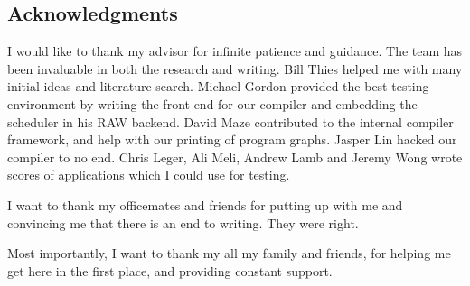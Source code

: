 \newpage

\subsection*{Acknowledgments}

I would like to thank my advisor for infinite patience and guidance. The {\StreamIt} team has been invaluable
in both the research and writing. Bill Thies helped me with many initial ideas and literature search. Michael Gordon
provided the best testing environment by writing the front end for our compiler and embedding the scheduler in his 
RAW backend. David Maze contributed to the internal compiler framework, and help with our printing of program graphs.
Jasper Lin hacked our compiler to no end. Chris Leger, Ali Meli, Andrew Lamb and Jeremy Wong wrote scores of
applications which I could use for testing.

I want to thank my officemates and friends for putting up with me and convincing me that there is an end to writing.
They were right.

Most importantly, I want to thank my all my family and friends, for helping me get here in the first place, 
and providing constant support.

